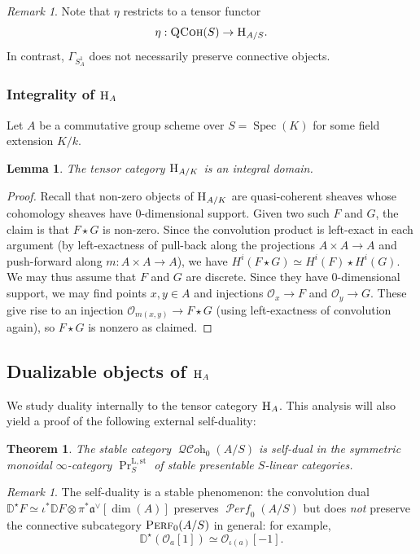 \documentclass[12pt, oneside]{amsart}
\numberwithin{equation}{section}
\newtheorem{theorem}[subsubsection]{Theorem}
\newtheorem{lemma}[subsubsection]{Lemma}
\theoremstyle{remark}
\newtheorem{remark}[subsubsection]{Remark}
\theoremstyle{plain}
\DeclareMathOperator{\QCoh}{\textsc{QCoh}}
\DeclareMathOperator{\QCOH}{\mathcal{QC}\textit{oh}}
\DeclareMathOperator{\Perf}{\textsc{Perf}}
\DeclareMathOperator{\PERF}{\mathcal{P}\textit{erf}}
\newcommand{\Hcat}{\textup{\textsc{H}}}
\newcommand{\HA}{\Hcat_A}
\newcommand{\HAS}{\Hcat_{A/S}}
\newcommand{\frav}{\mathfrak{a}^\vee}
\newcommand{\OO}{\mathcal{O}}
\DeclareMathOperator{\spc}{Spec}
\begin{document}
\begin{remark} Note that $\eta$ restricts to a tensor functor $$\eta:\QCoh(S) \rightarrow\HAS.$$ In contrast, $\Gamma_{S^1_A}$ does not necessarily preserve connective objects. \end{remark}

\subsubsection{Integrality of $\HA$}

Let $A$ be a commutative group scheme over $S=\spc(K)$ for some field extension $K/k$.

\begin{lemma}\label{HE int} The tensor category $\Hcat_{A/K}$ is an integral domain.\end{lemma}
\begin{proof} Recall that non-zero objects of $\Hcat_{A/K}$ are quasi-coherent sheaves whose cohomology sheaves have $0$-dimensional support. Given two such $F$ and $G$, the claim is that $F \star G$ is non-zero. Since the convolution product is left-exact in each argument (by left-exactness of pull-back along the projections $A \times A \to A$ and push-forward along $m : A \times A \to A$), we have $H^i(F \star G) \simeq H^i(F) \star H^i(G)$. We may thus assume that $F$ and $G$ are discrete. Since they have $0$-dimensional support, we may find points $x,y \in A$ and injections $\OO_{x}\rightarrow F$ and $\OO_{y}\rightarrow G$. These give rise to an injection $\OO_{m(x,y)} \rightarrow F \star G$ (using left-exactness of convolution again), so $F \star G$ is nonzero as claimed. \end{proof}

\subsection{Dualizable objects of \texorpdfstring{$\HA$}{H\_A}}
We study duality internally to the tensor category $\HA$.
This analysis will also yield a proof of the following external self-duality:

\begin{theorem}\label{thm:Hcat self dual} The stable category $\QCOH_0(A/S)$ is self-dual in the symmetric monoidal $\infty$-category $\operatorname{Pr}^{\mathrm{L,st}}_S$ of stable presentable $S$-linear categories. \end{theorem}

\begin{remark}
The self-duality is a stable phenomenon: the convolution dual $\mathbb{D}^\star F \simeq \iota^*\mathbb{D} F\otimes\pi^*\frav[\dim(A)]$ preserves $\PERF_0(A/S)$ but does \emph{not} preserve the connective subcategory $\Perf_0(A/S)$ in general: for example, $$\mathbb{D}^\star(\OO_a[1]) \simeq \OO_{\iota(a)}[-1].$$
\end{remark}
\end{document}
